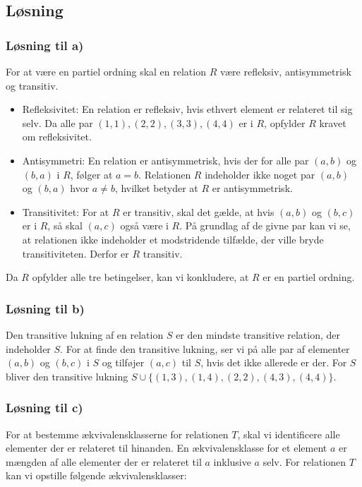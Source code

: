 \documentclass[12pt]{article}
\begin{document}
\subsection{Løsning}
\subsubsection{Løsning til a)}
For at være en partiel ordning skal en relation \( R \) være refleksiv, antisymmetrisk og transitiv.
\begin{itemize}
  \item Refleksivitet: En relation er refleksiv, hvis ethvert element er relateret til sig selv. Da alle par \( (1,1), (2,2), (3,3), (4,4) \) er i \( R \), opfylder \( R \) kravet om refleksivitet.
  \item Antisymmetri: En relation er antisymmetrisk, hvis der for alle par \( (a,b) \) og \( (b,a) \) i \( R \), følger at \( a=b \). Relationen \( R \) indeholder ikke noget par \( (a,b) \) og \( (b,a) \) hvor \( a \neq b \), hvilket betyder at \( R \) er antisymmetrisk.
  \item Transitivitet: For at \( R \) er transitiv, skal det gælde, at hvis \( (a,b) \) og \( (b,c) \) er i \( R \), så skal \( (a,c) \) også være i \( R \). På grundlag af de givne par kan vi se, at relationen ikke indeholder et modstridende tilfælde, der ville bryde transitiviteten. Derfor er \( R \) transitiv.
\end{itemize}
Da \( R \) opfylder alle tre betingelser, kan vi konkludere, at \( R \) er en partiel ordning.

\subsubsection{Løsning til b)}
Den transitive lukning af en relation \( S \) er den mindste transitive relation, der indeholder \( S \). For at finde den transitive lukning, ser vi på alle par af elementer \( (a,b) \) og \( (b,c) \) i \( S \) og tilføjer \( (a,c) \) til \( S \), hvis det ikke allerede er der. For \( S \) bliver den transitive lukning \( S \cup \{(1,3), (1,4), (2, 2), (4, 3), (4, 4)\} \).

\subsubsection{Løsning til c)}
For at bestemme ækvivalensklasserne for relationen \( T \), skal vi identificere alle elementer der er relateret til hinanden. En ækvivalensklasse for et element \( a \) er mængden af alle elementer der er relateret til \( a \) inklusive \( a \) selv. For relationen \( T \) kan vi opstille følgende ækvivalensklasser:
\end{document}
